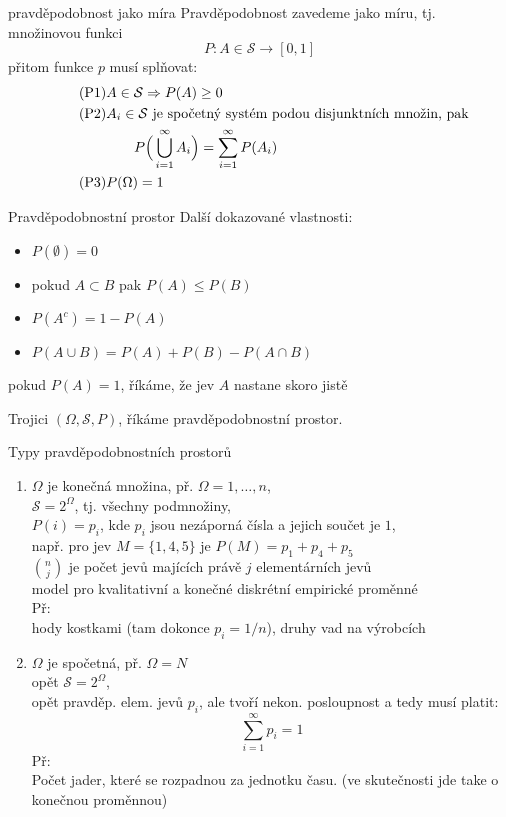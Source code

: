 \documentclass[smaller]{beamer}
\def\impl{\Rightarrow}
\def\blue#1{{\usebeamercolor[fg]{my blue} #1}}
\def\xskip{{\vspace{2ex}}}
\begin{document}
\begin{frame}{pravděpodobnost jako míra}
\blue{Pravděpodobnost} zavedeme jako míru, tj. množinovou funkci
\[
   P:  A\in \mathcal{S} \longrightarrow [0,1]
\]
přitom funkce $p$ musí splňovat:
\begin{align}
 \tag{P1}&
 A\in \mathcal{S} \impl  P(A)\ge 0\\
 \tag{P2}&
 A_i\in \mathcal{S} \text{ je spočetný systém podou disjunktních množin, pak}\\
    \notag        
     &\qquad P\Big(\bigcup_{i= 1}^{\infty} A_i\Big) = \sum_{i=1}^{\infty} P(A_i)\\
 \tag{P3}&
 P(\Omega) = 1
\end{align}
\end{frame}

\begin{frame}{Pravděpodobnostní prostor}
Další dokazované vlastnosti:
\begin{itemize}
 \item $P(\emptyset) = 0$
 \item pokud $A \subset B$ pak $P(A)\le P(B)$
 \item $P(A^c) = 1-P(A)$
 \item $P(A\cup B) = P(A) + P(B) - P(A\cap B)$
\end{itemize}

\xskip
pokud $P(A)=1$, říkáme, že jev $A$ nastane \blue{skoro jistě}

Trojici $(\Omega, \mathcal{S}, P)$, říkáme \blue{pravděpodobnostní prostor}.
\end{frame}

\begin{frame}{Typy pravděpodobnostních prostorů}
\begin{enumerate}
 \item $\Omega$ je konečná množina, př. $\Omega={1, \dots ,n}$,\\
       $\mathcal{S} = 2^\Omega$, tj. všechny podmnožiny,\\
       $P(i) = p_i$, kde $p_i$ jsou nezáporná čísla a jejich součet je $1$, \\
       např. pro jev $M = \{1,4,5\}$ je
       $P(M) = p_1 + p_4 + p_5$\\
       $\binom{n}{j}$ je počet jevů majících právě $j$ elementárních jevů\\
       model pro kvalitativní a konečné diskrétní empirické proměnné\\
       Př: \\
       hody kostkami (tam dokonce $p_i = 1/n$), druhy vad na výrobcích
       

 \item $\Omega$ je spočetná, př. $\Omega = N$\\
       opět $\mathcal{S} = 2^\Omega$,\\
       opět pravděp. elem. jevů $p_i$, ale tvoří nekon. posloupnost a tedy musí platit:\\
       \[
       \sum_{i=1}^\infty p_i = 1
       \]
       Př:\\
       Počet jader, které se rozpadnou za jednotku času. (ve skutečnosti jde take o konečnou proměnnou)
\end{enumerate}
\end{frame}
\end{document}
